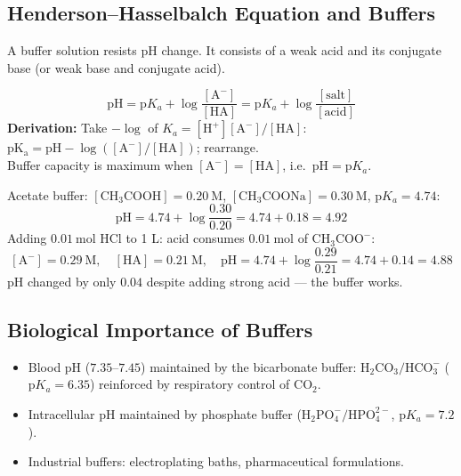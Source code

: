 \documentclass[12pt,a4paper]{article}
\begin{document}
\subsection{Henderson--Hasselbalch Equation and Buffers}
A buffer solution resists pH change. It consists of a weak acid and its conjugate base (or weak base and conjugate acid).

\begin{tcolorbox}[formulabox, title={Henderson--Hasselbalch Equation}]
\[
\mathrm{pH} = \mathrm{p}K_a + \log\frac{[\mathrm{A^-}]}{[\mathrm{HA}]} = \mathrm{p}K_a + \log\frac{[\text{salt}]}{[\text{acid}]}
\]
\textbf{Derivation:} Take $-\log$ of $K_a = [\mathrm{H^+}][\mathrm{A^-}]/[\mathrm{HA}]$: $\mathrm{pK_a} = \mathrm{pH} - \log([\mathrm{A^-}]/[\mathrm{HA}])$; rearrange.\\
Buffer capacity is maximum when $[\mathrm{A^-}] = [\mathrm{HA}]$, i.e.\ $\mathrm{pH} = \mathrm{p}K_a$.
\end{tcolorbox}

\begin{tcolorbox}[examplebox, title={Solved Example: Buffer pH and Its Change on Adding Acid}]
Acetate buffer: $[\mathrm{CH_3COOH}] = 0.20\ \mathrm{M}$, $[\mathrm{CH_3COONa}] = 0.30\ \mathrm{M}$, $\mathrm{p}K_a = 4.74$:
\[
\mathrm{pH} = 4.74 + \log\frac{0.30}{0.20} = 4.74 + 0.18 = 4.92
\]
Adding $0.01\ \mathrm{mol}$ HCl to 1 L: acid consumes $0.01\ \mathrm{mol}$ of $\mathrm{CH_3COO^-}$:
\[
[\mathrm{A^-}] = 0.29\ \mathrm{M},\quad [\mathrm{HA}] = 0.21\ \mathrm{M},\quad
\mathrm{pH} = 4.74 + \log\frac{0.29}{0.21} = 4.74 + 0.14 = 4.88
\]
pH changed by only $0.04$ despite adding strong acid --- the buffer works.
\end{tcolorbox}

\subsection{Biological Importance of Buffers}
\begin{itemize}[leftmargin=*, itemsep=2pt, topsep=2pt]
  \item Blood pH ($7.35$--$7.45$) maintained by the bicarbonate buffer: $\mathrm{H_2CO_3}/\mathrm{HCO_3^-}$ ($\mathrm{p}K_a = 6.35$) reinforced by respiratory control of $\mathrm{CO_2}$.
  \item Intracellular pH maintained by phosphate buffer ($\mathrm{H_2PO_4^-}/\mathrm{HPO_4^{2-}}$, $\mathrm{p}K_a = 7.2$).
  \item Industrial buffers: electroplating baths, pharmaceutical formulations.
\end{itemize}
\end{document}
